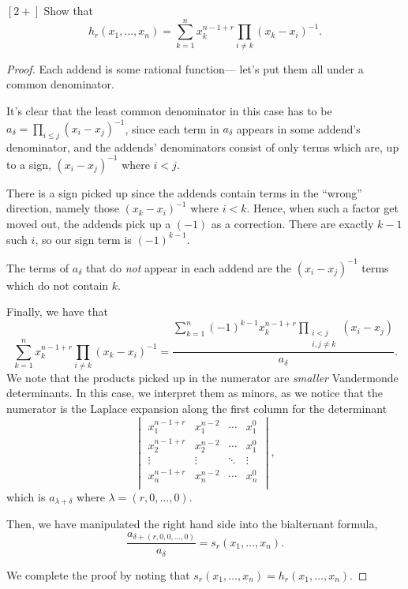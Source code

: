 \documentclass{article}
\begin{document}
\begin{exercise}
    $[2+]$
    Show that
    \[
        h_r(x_1,\ldots,x_n) = \sum_{k=1}^n x_k^{n-1+r}\prod_{i\neq k}(x_k-x_i)^{-1}.
    \]
\end{exercise}

\begin{proof}
    Each addend is some rational function--- let's put them all under a common denominator.

    It's clear that the least common denominator in this case has to be $a_\delta = \prod_{i\leq j}(x_i-x_j)^{-1}$, since each term in $a_\delta$ appears in some addend's denominator, and the addends' denominators consist of only terms which are, up to a sign, $(x_i-x_j)^{-1}$ where $i<j$.

    There is a sign picked up since the addends contain terms in the ``wrong'' direction, namely those $(x_k - x_i)^{-1}$ where $i < k$.
    Hence, when such a factor get moved out, the addends pick up a $(-1)$ as a correction. There are exactly $k-1$ such $i$, so our sign term is $(-1)^{k-1}$.

    The terms of $a_\delta$ that do \textit{not} appear in each addend are the $(x_i-x_j)^{-1}$ terms which do not contain $k$.

    Finally, we have that
    \[
        \sum_{k=1}^n x_k^{n-1+r}\prod_{i\neq k}(x_k-x_i)^{-1}
        =
        \frac{\displaystyle\sum_{k=1}^n (-1)^{k-1}x_k^{n-1+r}\prod_{\substack{i<j\\i,j\neq k}}(x_i-x_j)}{a_\delta}.
    \]
    We note that the products picked up in the numerator are \textit{smaller} Vandermonde determinants. In this case, we interpret them as minors, as we notice that the numerator is the Laplace expansion along the first column for the determinant
    \[
        \begin{vmatrix}
            x_1^{n-1+r} & x_1^{n-2} & \cdots & x_1^0 \\
            x_2^{n-1+r} & x_2^{n-2} & \cdots & x_1^0 \\
            \vdots & \vdots & \ddots & \vdots  \\
            x_n^{n-1+r} & x_n^{n-2} & \cdots & x_n^0 \\
        \end{vmatrix},
    \]
    which is $a_{\lambda + \delta}$ where $\lambda = (r,0,\ldots,0)$.

    Then, we have manipulated the right hand side into the bialternant formula,
    \[
        \frac{a_{\delta + (r,0,0,\ldots,0)}}{a_\delta} = s_r(x_1,\ldots,x_n).
    \]

    We complete the proof by noting that $s_r(x_1,\ldots,x_n) = h_r(x_1,\ldots,x_n)$.
\end{proof}
\end{document}
